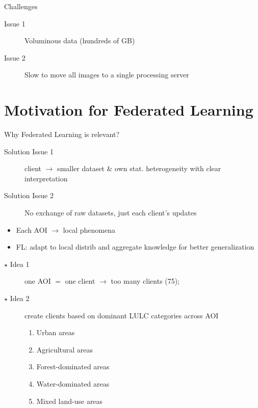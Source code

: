 \documentclass[aspectratio=169,xcolor=dvipsnames]{beamer}
\begin{document}
\begin{frame}{Challenges}
\begin{description}
    \item[Issue 1] Voluminous data (hundreds of GB)
    \item[Issue 2] Slow to move all images to a single processing server
\end{description}
\end{frame}

\section{Motivation for Federated Learning}

\begin{frame}{Why Federated Learning is relevant?}
\begin{description}
    \item[Solution Issue 1] client $\to$ smaller dataset $\&$ own stat. heterogeneity with clear interpretation
    \item[Solution Issue 2] No exchange of raw datasets, just each client's updates
\end{description}
\begin{itemize}
    \item Each AOI $\to$ local phenomena
    \item FL: adapt to local distrib and aggregate knowledge for better generalization
\end{itemize}
\begin{description}
    \item[$\star$ Idea 1] one AOI $=$ one client $\to$ too many clients (75);
    \item[$\star$ Idea 2] create clients based on dominant LULC categories across AOI
    \begin{enumerate}
        \item Urban areas
        \item Agricultural areas
        \item Forest-dominated areas
        \item Water-dominated areas
        \item Mixed land-use areas
    \end{enumerate}
\end{description}
\end{frame}
\end{document}
